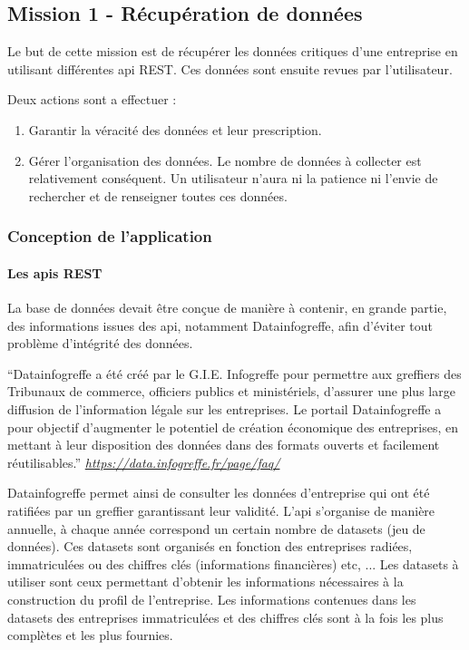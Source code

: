 \documentclass[french]{article}
\begin{document}
{\subsection{Mission 1 - Récupération de données}

Le but de cette mission est de récupérer les données critiques d'une entreprise en utilisant différentes api REST. Ces données sont ensuite revues par l'utilisateur. 

Deux actions sont a effectuer :

\begin{enumerate}
\item Garantir la véracité des données et leur prescription. 
\item Gérer l'organisation des données. Le nombre de données à collecter est relativement conséquent. Un utilisateur n'aura ni la patience ni l'envie de rechercher et de renseigner toutes ces données.  
\end{enumerate}

\subsubsection{Conception de l'application}

\paragraph{Les apis REST}
La base de données devait être conçue de manière à contenir, en grande partie, des informations issues des api, notamment Datainfogreffe, afin d'éviter tout problème d'intégrité des données.

\enquote{Datainfogreffe a été créé par le G.I.E. Infogreffe pour permettre aux greffiers des Tribunaux de commerce, officiers publics et ministériels, d'assurer une plus large diffusion de l'information légale sur les entreprises. Le portail Datainfogreffe a pour objectif d'augmenter le potentiel de création économique des entreprises, en mettant à leur disposition des données dans des formats ouverts et facilement réutilisables.} \textit{\url{https://data.infogreffe.fr/page/faq/}}

Datainfogreffe permet ainsi de consulter les données d'entreprise qui ont été ratifiées par un greffier garantissant leur validité. L'api s'organise de manière annuelle, à chaque année correspond un certain nombre de datasets (jeu de données). Ces datasets sont organisés en fonction des entreprises radiées, immatriculées ou des chiffres clés (informations financières) etc, ... 
\newline{}
Les datasets à utiliser sont ceux permettant d'obtenir les informations nécessaires à la construction du profil de l'entreprise. Les informations contenues dans les datasets des entreprises immatriculées et des chiffres clés sont à la fois les plus complètes et les plus fournies.

}
\end{document}
